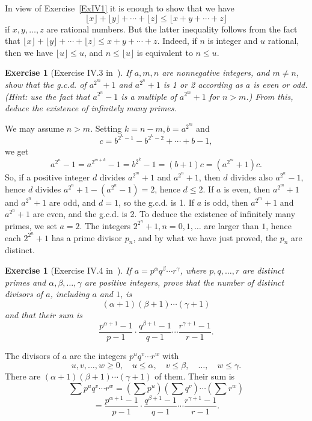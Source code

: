 \documentclass[12pt,letterpaper]{article}
\newtheorem{exer}[thm]{Exercise}
\theoremstyle{definition}
\begin{document}
In view of Exercise~\ref{ExIV1} it is enough to show that we have 
$$
\lfloor x\rfloor+\lfloor y\rfloor+\cdots+\lfloor z\rfloor\le\lfloor x+y+\cdots+z\rfloor
$$ 
if $x,y,\ldots,z$ are rational numbers. But the latter inequality follows from the fact that $\lfloor x\rfloor+\lfloor y\rfloor+\cdots+\lfloor z\rfloor\le x+y+\cdots+z$. Indeed, if $n$ is integer and $u$ rational, then we have $\lfloor u\rfloor\le u$, and $n\le\lfloor u\rfloor$ is equivalent to $n\le u$. 

\begin{exer}[Exercise IV.3 in~\cite{weil1979}]
If $a,m,n$ are nonnegative integers, and $m\ne n$, show that the g.c.d. of $a^{2^m}+1$ and $a^{2^n}+1$ is 1 or 2 according as $a$ is even or odd. (Hint: use the fact that $a^{2^n}-1$ is a multiple of $a^{2^m}+1$ for $n>m$.) From this, deduce the existence of infinitely many primes. 
\end{exer} 

We may assume $n>m$. Setting $k=n-m,b=a^{2^m}$ and 
$$
c=b^{2^k-1}-b^{2^k-2}+\cdots+b-1,
$$ 
we get 
$$
a^{2^n}-1=a^{2^{m+k}}-1=b^{2^k}-1=(b+1)c=(a^{2^m}+1)c.
$$ 
So, if a positive integer $d$ divides $a^{2^m}+1$ and $a^{2^n}+1$, then $d$ divides also $a^{2^n}-1$, hence $d$ divides $a^{2^n}+1-(a^{2^n}-1)=2$, hence $d\le2$. If $a$ is even, then $a^{2^m}+1$ and $a^{2^n}+1$ are odd, and $d=1$, so the g.c.d. is 1. If $a$ is odd, then $a^{2^m}+1$ and $a^{2^n}+1$ are even, and the g.c.d. is 2. To deduce the existence of infinitely many primes, we set $a=2$. The integers $2^{2^n}+1,n=0,1,\ldots$ are larger than $1$, hence each $2^{2^n}+1$ has a prime divisor $p_n$, and by what we have just proved, the $p_n$ are distinct. 

\begin{exer}[Exercise IV.4 in~\cite{weil1979}]\label{ExIV4}
If $a=p^{\alpha}q^{\beta}\cdots r^{\gamma}$, where $p,q,\ldots,r$ are distinct primes and $\alpha,\beta,\ldots,\gamma$ are positive integers, prove that the number of distinct divisors of $a$, including $a$ and $1$, is
\[
(\alpha+1)(\beta+1)\cdots(\gamma+1)
\]
and that their sum is
\[
\frac{p^{\alpha+1}-1}{p-1}\cdot\frac{q^{\beta+1}-1}{q-1}\cdots\frac{r^{\gamma+1}-1}{r-1}.
\]
\end{exer}

The divisors of $a$ are the integers $p^u q^v \cdots r^w$ with 
$$
u, v, \ldots, w \ge 0,\quad u \le \alpha,\quad v \le \beta,\quad \ldots,\quad w \le \gamma.
$$ 
There are $(\alpha+1)(\beta+1)\cdots(\gamma+1)$ of them. Their sum is 
$$
\sum p^u q^v\cdots r^w = \left(\sum p^u\right) \left(\sum q^v\right)\cdots \left(\sum r^w\right)
$$ 
\[
=\frac{p^{\alpha+1}-1}{p-1}\cdot\frac{q^{\beta+1}-1}{q-1}\cdots\frac{r^{\gamma+1}-1}{r-1}.
\]
\end{document}
